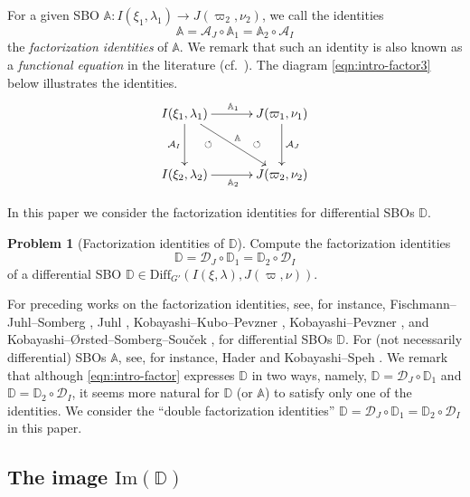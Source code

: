 \documentclass[reqno,11pt]{amsart}
\theoremstyle{remark}
\theoremstyle{definition}
\newtheorem{prob}{Problem}
\numberwithin{equation}{section}
\newcommand{\Cal}{\mathcal}
\renewcommand{\Im}{\mathrm{Im}}
\newcommand{\Diff}{\mathrm{Diff}}
\newcommand{\D}{\Cal{D}}
\newcommand{\bD}{\mathbb{D}}
\newcommand{\A}{\Cal{A}}
\newcommand{\bA}{\mathbb{A}}
\begin{document}
\noindent
For a given SBO 
$\bA \colon I(\xi_1,\lambda_1) \to J(\varpi_2, \nu_2)$,
we call the identities 
\begin{equation*}
\bA = \A_J\circ \bA_1 =\bA_2\circ \A_I 
\end{equation*}
the \emph{factorization identities} of $\bA$.
We remark that such an identity is also known as 
a \emph{functional equation} in the literature (cf.\ \cite{KS15, KS18}).
The diagram \eqref{eqn:intro-factor3} below illustrates the identities.
\begin{equation*}\label{eqn:intro-factor3}
\begin{aligned}
\xymatrix@=13pt{
I(\xi_1,\lambda_1)
 \ar[dd]_{\A_I}
  \ar[rrdd]^{\bA}
  \ar[rr]^{\bA_1}
 && J(\varpi_1,\nu_1)
   \ar[dd]^{\A_J}
  \ar@{}[ldd]|{\circlearrowleft}
 \\
&&\\
I(\xi_2,\lambda_2)
\ar[rr]_{\bA_2}   \ar@{}[ruu]|{\circlearrowleft}
&&
J(\varpi_2,\nu_2)
}
\end{aligned}
\end{equation*}

In this paper we consider the factorization identities for differential SBOs $\bD$.

\begin{prob}[{Factorization identities of $\bD$}]\label{prob:B}
Compute the factorization identities 
\begin{equation}\label{eqn:intro-factor}
\bD = \D_J\circ \bD_1 =\bD_2\circ \D_I 
\end{equation}
of a differential SBO 
$\bD \in \Diff_{G'}(I(\xi,\lambda), J(\varpi,\nu))$.
\end{prob}

For preceding works on the factorization identities, see, for instance,
Fischmann--Juhl--Somberg \cite{FJS20},
Juhl \cite{Juhl09}, 
Kobayashi--Kubo--Pevzner \cite{KKP16}, 
Kobayashi--Pevzner \cite{KP2}, and
Kobayashi--{\O}rsted--Somberg--Sou{\v c}ek \cite{KOSS15}, 
for differential SBOs $\bD$.
For (not necessarily differential) SBOs $\bA$, see, for instance, 
Hader \cite{Hader22} and
Kobayashi--Speh \cite{KS15, KS18}.
We remark that although \eqref{eqn:intro-factor} expresses 
$\bD$ in two ways, namely, $\bD=\D_J\circ \bD_1$ and 
$\bD =\bD_2\circ \D_I$, it seems more natural for $\bD$ (or $\bA$)
to satisfy only one of the 
identities. We consider the ``double factorization identities''
$\bD = \D_J\circ \bD_1 =\bD_2\circ \D_I$ in this paper.

\subsection{The image $\Im(\bD)$}
\end{document}
